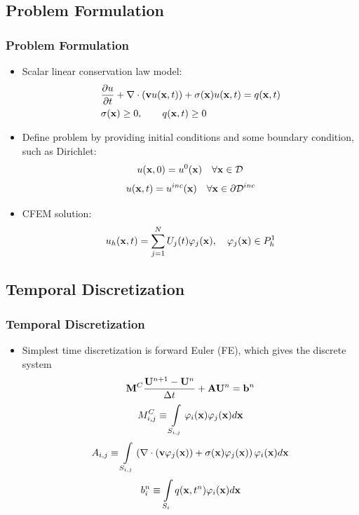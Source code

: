 \documentclass{beamer}
\begin{document}
\subsection{Problem Formulation}
\begin{frame}
\frametitle{Problem Formulation}

\begin{itemize}
   \item Scalar linear conservation law model:
   \begin{align}
      &\frac{\partial u}{\partial t} + \nabla\cdot(\mathbf{v}u(\mathbf{x},t))
      + \sigma(\mathbf{x})u(\mathbf{x},t) = q(\mathbf{x},t)\\
      &\sigma(\mathbf{x})\ge 0,\qquad q(\mathbf{x},t)\ge 0\nonumber
   \end{align}
   \item Define problem by providing initial conditions and some boundary
      condition, such as Dirichlet:
   \begin{equation}
      u(\mathbf{x},0) = u^0(\mathbf{x}) \quad \forall \mathbf{x}\in \mathcal{D}
   \end{equation}
   \begin{equation}
      u(\mathbf{x},t) = u^{inc}(\mathbf{x}) \quad \forall \mathbf{x}\in \partial \mathcal{D}^{inc}
   \end{equation}
   \item CFEM solution:
   \begin{equation}
      u_h(\mathbf{x},t) = \sum\limits_{j=1}^N U_j(t) \varphi_j(\mathbf{x}),
      \quad \varphi_j(\mathbf{x})\in P^1_h
   \end{equation}
\end{itemize}

\end{frame}
\subsection{Temporal Discretization}
\begin{frame}
\frametitle{Temporal Discretization}

\begin{itemize}
   \item Simplest time discretization is forward Euler (FE), which gives the
      discrete system
   \begin{equation}\label{eq:exgalerkin}
      \mathbf{M}^C\frac{\mathbf{U}^{n+1}-\mathbf{U}^n}{\Delta t} + \mathbf{A}\mathbf{U}^n = \mathbf{b}^n
   \end{equation}
   \begin{equation}
      M_{i,j}^C \equiv \int\limits_{S_{i,j}}\varphi_i(\mathbf{x}) \varphi_j(\mathbf{x}) d\mathbf{x}
   \end{equation}
   \begin{equation}
      A_{i,j} \equiv \int\limits_{S_{i,j}}\left(
      \nabla\cdot(\mathbf{v}\varphi_j(\mathbf{x})) +
		\sigma(\mathbf{x})\varphi_j(\mathbf{x})\right)\varphi_i(\mathbf{x}) d\mathbf{x}
   \end{equation}
   \begin{equation}
      b_i^n \equiv \int\limits_{S_i} q(\mathbf{x},t^n)\varphi_i(\mathbf{x}) d\mathbf{x}
   \end{equation}
\end{itemize}

\end{frame}
\end{document}
